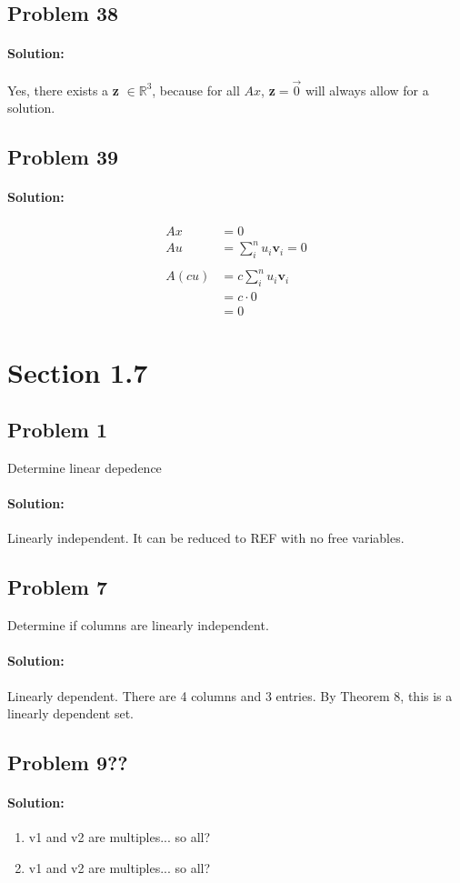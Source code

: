 \documentclass[11pt, notitlepage]{report}
\newcommand{\R}{\mathbb{R}}
\newenvironment{solution}{\paragraph{\small Solution:}}{\hfill}
\begin{document}
\subsection{Problem 38}
\begin{solution}

Yes, there exists a \textbf{z} $\in \R^3$, because for all $Ax$, \textbf{z}$=\vec{0}$ will always allow for a solution.

\end{solution}

\subsection{Problem 39}
\begin{solution}

\begin{align*}
Ax&=0\\
Au&=\sum_{i}^{n}{u_i\textbf{v}_i}=0 \\\\
A(cu)&=c\sum_{i}^{n}{u_i\textbf{v}_i}\\
&=c\cdot0\\
&=0
\end{align*}


\end{solution}

\section{Section 1.7}
\subsection{Problem 1}
Determine linear depedence
\begin{solution}
Linearly independent. It can be reduced to REF with no free variables.
\end{solution}

\subsection{Problem 7}
Determine if columns are linearly independent.
\begin{solution}
Linearly dependent. There are 4 columns and 3 entries. By Theorem 8, this is a linearly dependent set.
\end{solution}
\subsection{Problem 9??}
\begin{solution}
\begin{enumerate}[label=\alph*.)]
	\item v1 and v2 are multiples... so all?
	\item v1 and v2 are multiples... so all?
\end{enumerate}
\end{solution}
\end{document}
